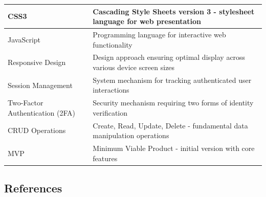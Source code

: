 \documentclass[12pt,a4paper]{article}
\begin{document}
\begin{longtable}{|p{4cm}|p{10cm}|}
CSS3 & Cascading Style Sheets version 3 - stylesheet language for web presentation \\ \hline

JavaScript & Programming language for interactive web functionality \\ \hline

Responsive Design & Design approach ensuring optimal display across various device screen sizes \\ \hline

Session Management & System mechanism for tracking authenticated user interactions \\ \hline

Two-Factor Authentication (2FA) & Security mechanism requiring two forms of identity verification \\ \hline

CRUD Operations & Create, Read, Update, Delete - fundamental data manipulation operations \\ \hline

MVP & Minimum Viable Product - initial version with core features \\ \hline

\end{longtable}

\subsection{References}
\end{document}
